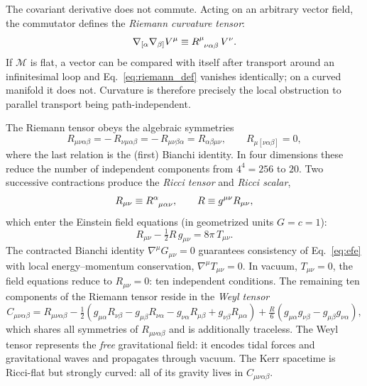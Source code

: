 \documentclass[11pt]{book}
\begin{document}
The covariant derivative does not commute. Acting on an arbitrary vector field, the
commutator defines the \emph{Riemann curvature tensor}:
\begin{equation}\label{eq:riemann_def}
    \nabla_{[\alpha} \nabla_{\beta]} V^\mu
    \equiv \tensor{R}{^\mu_{\nu\alpha\beta}}\, V^\nu .
\end{equation}
If $\mathcal{M}$ is flat, a vector can be compared with itself after transport around an
infinitesimal loop and Eq.~\eqref{eq:riemann_def} vanishes identically; on a curved
manifold it does not. Curvature is therefore precisely the local obstruction to parallel
transport being path-independent.

The Riemann tensor obeys the algebraic symmetries
\begin{equation}
    R_{\mu\nu\alpha\beta} = -\,R_{\nu\mu\alpha\beta} = -\,R_{\mu\nu\beta\alpha}
    = R_{\alpha\beta\mu\nu}, \qquad
    R_{\mu[\nu\alpha\beta]} = 0 ,
\end{equation}
where the last relation is the (first) Bianchi identity. In four dimensions these reduce
the number of independent components from $4^4 = 256$ to $20$. Two successive
contractions produce the \emph{Ricci tensor} and \emph{Ricci scalar},
\begin{equation}
    R_{\mu\nu} \equiv \tensor{R}{^\alpha_{\mu\alpha\nu}} , \qquad
    R \equiv g^{\mu\nu} R_{\mu\nu},
\end{equation}
which enter the Einstein field equations (in geometrized units $G = c = 1$):
\begin{equation}\label{eq:efe}
    R_{\mu\nu} - \tfrac{1}{2} R\, g_{\mu\nu} = 8\pi\, T_{\mu\nu}.
\end{equation}
The contracted Bianchi identity $\nabla^\mu G_{\mu\nu} = 0$ guarantees consistency of
Eq.~\eqref{eq:efe} with local energy--momentum conservation, $\nabla^\mu T_{\mu\nu} = 0$.
In vacuum, $T_{\mu\nu} = 0$, the field equations reduce to $R_{\mu\nu} = 0$: ten
independent conditions. The remaining ten components of the Riemann tensor reside in the
\emph{Weyl tensor}
\begin{equation}
    C_{\mu\nu\alpha\beta} = R_{\mu\nu\alpha\beta}
    - \tfrac{1}{2}\!\left(g_{\mu\alpha}R_{\nu\beta} - g_{\mu\beta}R_{\nu\alpha}
    - g_{\nu\alpha}R_{\mu\beta} + g_{\nu\beta}R_{\mu\alpha}\right)
    + \tfrac{R}{6}\left(g_{\mu\alpha}g_{\nu\beta} - g_{\mu\beta}g_{\nu\alpha}\right),
\end{equation}
which shares all symmetries of $R_{\mu\nu\alpha\beta}$ and is additionally traceless. The
Weyl tensor represents the \emph{free} gravitational field: it encodes tidal forces and
gravitational waves and propagates through vacuum. The Kerr spacetime is Ricci-flat but
strongly curved: all of its gravity lives in $C_{\mu\nu\alpha\beta}$.
\end{document}
